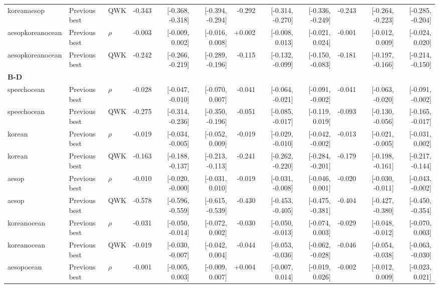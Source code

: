 \begin{landscape}
\begin{longtable}{@{}lllrrrrrrrrr@{}}
koreanaesop & Previous best & QWK & -0.343 & [-0.368, -0.318] & [-0.394, -0.294] & -0.292 & [-0.314, -0.270] & [-0.336, -0.249] & -0.243 & [-0.264, -0.223] & [-0.285, -0.204]\\
aesopkoreanocean & Previous best & $\rho$ & -0.003 & [-0.009, 0.002] & [-0.016, 0.008] & +0.002 & [-0.008, 0.013] & [-0.021, 0.024] & -0.001 & [-0.012, 0.009] & [-0.024, 0.020]\\
aesopkoreanocean & Previous best & QWK & -0.242 & [-0.266, -0.219] & [-0.289, -0.196] & -0.115 & [-0.132, -0.099] & [-0.150, -0.083] & -0.181 & [-0.197, -0.166] & [-0.214, -0.150]\\
\multicolumn{12}{l}{\textbf{B-D}}\\*
speechocean & Previous best & $\rho$ & -0.028 & [-0.047, -0.010] & [-0.070, 0.007] & -0.041 & [-0.064, -0.021] & [-0.091, -0.002] & -0.041 & [-0.063, -0.020] & [-0.091, -0.002]\\
speechocean & Previous best & QWK & -0.275 & [-0.314, -0.236] & [-0.350, -0.196] & -0.051 & [-0.085, -0.017] & [-0.119, 0.019] & -0.093 & [-0.130, -0.056] & [-0.165, -0.017]\\
korean & Previous best & $\rho$ & -0.019 & [-0.034, -0.005] & [-0.052, 0.009] & -0.019 & [-0.029, -0.010] & [-0.042, -0.002] & -0.013 & [-0.021, -0.005] & [-0.031, 0.002]\\
korean & Previous best & QWK & -0.163 & [-0.188, -0.137] & [-0.213, -0.113] & -0.241 & [-0.262, -0.220] & [-0.284, -0.201] & -0.179 & [-0.198, -0.161] & [-0.217, -0.144]\\
aesop & Previous best & $\rho$ & -0.010 & [-0.020, -0.000] & [-0.031, 0.010] & -0.019 & [-0.031, -0.008] & [-0.046, 0.001] & -0.020 & [-0.030, -0.011] & [-0.043, -0.002]\\
aesop & Previous best & QWK & -0.578 & [-0.596, -0.559] & [-0.615, -0.539] & -0.430 & [-0.453, -0.405] & [-0.475, -0.381] & -0.404 & [-0.427, -0.380] & [-0.450, -0.354]\\
koreanocean & Previous best & $\rho$ & -0.031 & [-0.050, -0.014] & [-0.072, 0.002] & -0.030 & [-0.050, -0.013] & [-0.074, 0.003] & -0.029 & [-0.048, -0.012] & [-0.070, 0.003]\\
koreanocean & Previous best & QWK & -0.019 & [-0.030, -0.007] & [-0.042, 0.004] & -0.044 & [-0.053, -0.036] & [-0.062, -0.028] & -0.046 & [-0.054, -0.038] & [-0.063, -0.030]\\
aesopocean & Previous best & $\rho$ & -0.001 & [-0.005, 0.003] & [-0.009, 0.007] & +0.004 & [-0.007, 0.014] & [-0.019, 0.026] & -0.002 & [-0.012, 0.009] & [-0.023, 0.021]\\

\end{longtable}
\end{landscape}
